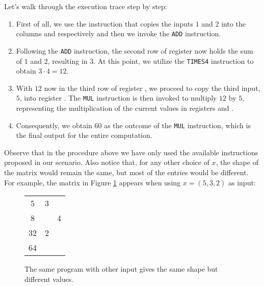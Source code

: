 Let's walk through the execution trace step by step:

\begin{enumerate}

\item First of all, we use the instruction that copies the inputs $1$ and $2$ into the columns \A and \B respectively and then we invoke the \texttt{ADD} instruction.

\item Following the \texttt{ADD} instruction, the second row of register \A now holds the sum of $1$ and $2$, resulting in $3$. At this point, we utilize the \texttt{TIMES4} instruction to obtain $3 \cdot 4 = 12$.

\item With $12$ now in the third row of register \A, we proceed to copy the third input, $5$, into register \B. The \texttt{MUL} instruction is then invoked to multiply $12$ by $5$, representing the multiplication of the current values in registers \A and \B.

\item Consequently, we obtain $60$ as the outcome of the \texttt{MUL} instruction, which is the final output for the entire computation.

\end{enumerate}

Observe that in the procedure above we have only used the available instructions proposed in our scenario. Also notice that, for any other choice of $x$, the shape of the matrix would remain the same, but most of the entries would be different. For example, the matrix in Figure \ref{fig:different-iputs-same-program} appears when using $x = (5, 3, 2)$ as input:

\begin{figure}[H]
\centering

\begin{tabular}{|c|c|c|}
\hline
\A & \B & \cellcolor{lightgray} \C \\ \hline
5 & 3 & \cellcolor{lightgray} \\ \hline
8 & & \cellcolor{lightgray} 4 \\ \hline
32 & 2 & \cellcolor{lightgray} \\ \hline
64 & & \cellcolor{lightgray} \\ \hline
\end{tabular}
\caption{The same program with other input gives the same shape but different values.}
\label{fig:different-iputs-same-program}
\end{figure}

